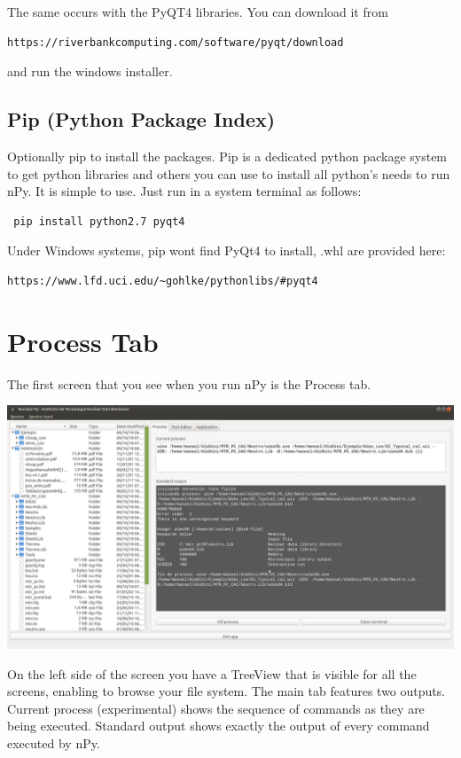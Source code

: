 \documentclass[a4paper,10pt]{article}
\begin{document}
The same occurs with the PyQT4 libraries. You can download it from 
\begin{verbatim}
https://riverbankcomputing.com/software/pyqt/download 
\end{verbatim}
\noindent and run the windows installer.

\subsection{Pip (Python Package Index)}

Optionally pip to install the packages. Pip is a dedicated python package system to get python libraries and others you can use to install all python's needs to run nPy. It is simple to use. Just run in a system terminal as follows:

\begin{verbatim}
 pip install python2.7 pyqt4
\end{verbatim}

\noindent Under Windows systems, pip wont find PyQt4 to install, .whl are provided here: 

\begin{verbatim}
https://www.lfd.uci.edu/~gohlke/pythonlibs/#pyqt4 
\end{verbatim}

\section{Process Tab}

The first screen that you see when you run nPy is the Process tab.

\begin{center}
 \includegraphics[width=\textwidth]{img/mainWindow.png}
\end{center}

On the left side of the screen you have a TreeView that is visible for all the screens, enabling to browse your file system. The main tab features two outputs. Current process (experimental) shows the sequence of commands as they are being executed. Standard output shows exactly the output of every command executed by nPy.
\end{document}
